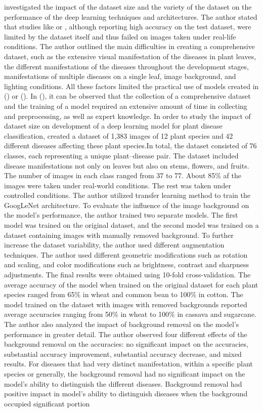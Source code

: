 \documentclass{BachelorBUI}
\begin{document}
\textcite{Barbedo:2018:1} investigated the impact of the dataset size and the variety of the dataset on the performance of the deep learning techniques and architectures. The author stated that studies like \cite{Mohanty:2016} or \cite{Ferentinos:2018}, although reporting high accuracy on the test dataset, were limited by the dataset itself and thus failed on images taken under real-life conditions. The author outlined the main difficulties in creating a comprehensive dataset, such as the extensive visual manifestation of the diseases in plant leaves, the different manifestations of the diseases throughout the development stages, manifestations of multiple diseases on a single leaf, image background, and lighting conditions. All these factors limited the practical use of models created in (\cite{Mohanty:2016}) or (\cite{Ferentinos:2018}). In (\cite{Picon:2019}), it can be observed that the collection of a comprehensive dataset and the training of a model required an extensive amount of time in collecting and preprocessing, as well as expert knowledge. In order to study the impact of dataset size on development of a deep learning model for plant disease classification, \textcite{Barbedo:2018:1} created a dataset of 1,383 images of 12 plant species and 42 different diseases affecting these plant species.In total, the dataset consisted of 76 classes, each representing a unique plant--disease pair. The dataset included disease manifestations not only on leaves but also on stems, flowers, and fruits. The number of images in each class ranged from 37 to 77. About 85\% af the images were taken under real-world conditions. The rest was taken under controlled conditions. The author utilized transfer learning method to train the GoogLeNet architecture. To evaluate the influence of the image background on the model's performance, the author trained two separate models. The first model was trained on the original dataset, and the second model was trained on a dataset containing images with manually removed background. To further increase the dataset variability, the author used different augmentation techniques. The author used different geometric modifications such as rotation and scaling, and color modifications such as brightness, contrast and sharpness adjustments. The final results were obtained using 10-fold cross-validation. The average accuracy of the model when trained on the original dataset for each plant species ranged from 65\% in wheat and common bean to 100\% in cotton. The model trained on the dataset with images with removed backgrounds reported average accuracies ranging from 50\% in wheat to 100\% in cassava and sugarcane. The author also analyzed the impact of background removal on the model's performance in greater detail. The author observed four different effects of the background removal on the accuracies: no significant impact on the accuracies, substantial accuracy improvement, substantial accuracy decrease, and mixed results. For diseases that had very distinct manifestation, within a specific plant species or generally, the background removal had no significant impact on the model's ability to distinguish the different diseases. Background removal had positive impact in model's ability to distinguish diseases when the background occupied significant portion 
\end{document}
